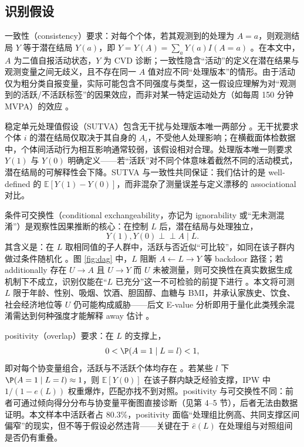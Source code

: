 \documentclass[12pt,a4paper]{article}
\newcommand{\E}{\mathbb{E}}
\newcommand{\indep}{\perp\!\!\!\perp}
\begin{document}
\subsection{识别假设}

一致性（consistency）要求：对每个个体，若其观测到的处理为 $A=a$，则观测结局 $Y$ 等于潜在结局 $Y(a)$，即 $Y=Y(A)=\sum_a Y(a)I(A=a)$ \cite{hernan2024whatif}。在本文中，$A$ 为二值自报活动状态，$Y$ 为 CVD 诊断；一致性隐含“活动”的定义在潜在结果与观测变量之间无歧义，且不存在同一 $A$ 值对应不同“处理版本”的情形。由于活动仅为粗分类自报变量，实际可能包含不同强度与类型，这一假设应理解为对“观测到的活跃/不活跃标签”的因果效应，而非对某一特定运动处方（如每周 150 分钟 MVPA）的效应 \cite{mi2025creview}。

稳定单元处理值假设（SUTVA）包含无干扰与处理版本唯一两部分 \cite{hernan2024whatif}。无干扰要求个体 $i$ 的潜在结局仅取决于其自身的 $A_i$，不受他人处理影响；在横截面体检数据中，个体间活动行为相互影响通常较弱，该假设相对合理。处理版本唯一则要求 $Y(1)$ 与 $Y(0)$ 明确定义——若“活跃”对不同个体意味着截然不同的活动模式，潜在结局的可解释性会下降。SUTVA 与一致性共同保证：我们估计的是 well-defined 的 $\E[Y(1)-Y(0)]$，而非混杂了测量误差与定义漂移的 associational 对比。

条件可交换性（conditional exchangeability，亦记为 ignorability 或“无未测混淆”）是观察性因果推断的核心：在控制 $L$ 后，潜在结局与处理独立，
\[
Y(1),Y(0)\indep A\mid L.
\]
其含义是：在 $L$ 取相同值的子人群中，活跃与否近似“可比较”，如同在该子群内做过条件随机化 \cite{hernan2024whatif,rosenbaum1983central}。图 \ref{fig:dag} 中，$L$ 阻断 $A\leftarrow L\to Y$ 等 backdoor 路径；若 additionally 存在 $U\to A$ 且 $U\to Y$ 而 $U$ 未被测量，则可交换性在真实数据生成机制下不成立，识别仅能在“$L$ 已充分”这一不可检验的前提下进行 \cite{hernan2024whatif}。本文将可测 $L$ 限于年龄、性别、吸烟、饮酒、胆固醇、血糖与 BMI，并承认家族史、饮食、社会经济地位等 $U$ 仍可能构成威胁——后文 E-value 分析即用于量化此类残余混淆需达到何种强度才能解释 away 估计 \cite{vanderweele2017evalue}。

positivity（overlap）要求：在 $L$ 的支撑上，
\[
0<\P(A=1\mid L=l)<1,
\]
即对每个协变量组合，活跃与不活跃个体均存在 \cite{hernan2024whatif,chen2024iptw}。若某些 $l$ 下 $\P(A=1\mid L=l)\approx 1$，则 $\E[Y(0)]$ 在该子群内缺乏经验支撑，IPW 中 $1/(1-e(L))$ 权重爆炸，匹配亦找不到对照。positivity 与可交换性不同：前者可通过倾向得分分布与协变量平衡图直接诊断（见第 4–5 节），后者无法由数据证明。本文样本中活跃者占 80.3\%，positivity 面临“处理组比例高、共同支撑区间偏窄”的现实，但不等于假设必然违背——关键在于 $\hat e(L)$ 在处理组与对照组间是否仍有重叠。
\end{document}
